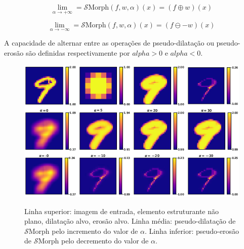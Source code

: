 \begin{equation}
    \lim_{\alpha \to +\infty} = \mathcal{S}\text{Morph}(f, w, \alpha)(x) = (f \oplus w)(x)
    \label{eq:equation18}
\end{equation}

\begin{equation}
    \lim_{\alpha \to -\infty} = \mathcal{S}\text{Morph}(f, w, \alpha)(x) = (f \ominus -w)(x)
    \label{eq:equation19}
\end{equation}

A capacidade de alternar entre as operações de pseudo-dilatação ou pseudo-erosão são definidas respectivamente por $alpha > 0$ e $alpha < 0$.

\begin{figure}[h]
    \caption{Linha superior: imagem de entrada, elemento estruturante não plano, dilatação alvo, erosão alvo. Linha média: pseudo-dilatação de $\mathcal{S}$Morph pelo incremento do valor de $\alpha$. Linha inferior: pseudo-erosão de $\mathcal{S}$Morph pelo decremento do valor de $\alpha$.}
    \centering
    \includegraphics[scale=0.9]{images/SMorph}
    \label{fig:smorph}
\end{figure}
